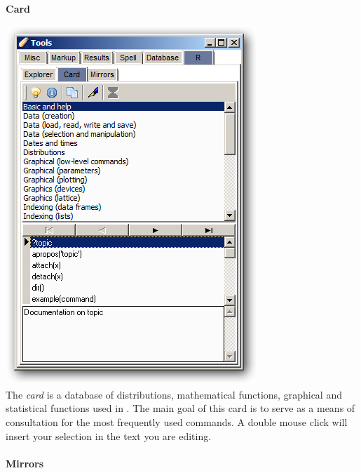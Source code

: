 \newpage
\paragraph{}\textbf{Card}\\

\includegraphics[scale=0.50]{./res/tools_r_card.png} \\

The \textit{card} is a database of distributions, mathematical functions, graphical and statistical functions used in \RR{}.
The main goal of this card is to serve as a means of consultation for the most frequently used commands.
A double mouse click will insert your selection in the text you are editing.

\paragraph{}\textbf{Mirrors}\\

